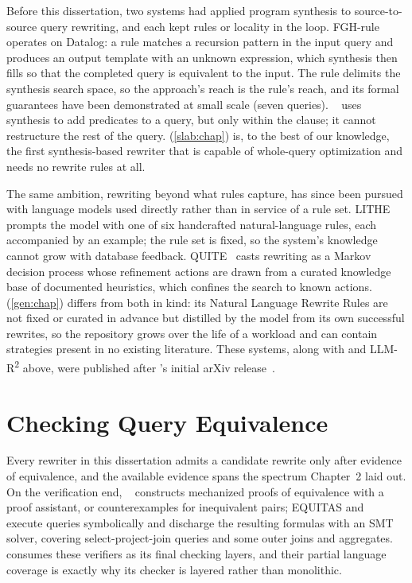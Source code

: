 Before this dissertation, two systems had applied program synthesis to
source-to-source query rewriting, and each kept rules or locality in
the loop. FGH-rule~\cite{wang2022optimizing} operates on Datalog: a
rule matches a recursion pattern in the input query and produces an
output template with an unknown expression, which synthesis then fills
so that the completed query is equivalent to the input. The rule
delimits the synthesis search space, so the approach's reach is the
rule's reach, and its formal guarantees have been demonstrated at
small scale (seven queries). \sia~\cite{zhou2021sia} uses synthesis to
add predicates to a query, but only within the \sqlwherecolor clause;
it cannot restructure the rest of the query. \slabcity
(\cref{slab:chap}) is, to the best of our knowledge, the first
synthesis-based rewriter that is capable of whole-query optimization
and needs no rewrite rules at all.

The same ambition, rewriting beyond what rules capture, has since been
pursued with language models used directly rather than in service of a
rule set. LITHE~\cite{llm-rw2} prompts the model with one of six
handcrafted natural-language rules, each accompanied by an example;
the rule set is fixed, so the system's knowledge cannot grow with
database feedback. QUITE~\cite{song2025quite} casts rewriting as a
Markov decision process whose refinement actions are drawn from a
curated knowledge base of documented heuristics, which confines the
search to known actions. \genrewrite (\cref{gen:chap}) differs from
both in kind: its Natural Language Rewrite Rules are not fixed or
curated in advance but distilled by the model from its own successful
rewrites, so the repository grows over the life of a workload and can
contain strategies present in no existing literature. These systems,
along with \rbot and \textsc{LLM-R\textsuperscript{2}} above, were
published after \genrewrite's initial arXiv
release~\cite{genrewrite-report}.

\section{Checking Query Equivalence}
\label{sec:related:equiv}

Every rewriter in this dissertation admits a candidate rewrite only
after evidence of equivalence, and the available evidence spans the
spectrum Chapter~2 laid out. On the verification end,
\cosette~\cite{chu2017cosette} constructs mechanized proofs of
equivalence with a proof assistant, or counterexamples for
inequivalent pairs; EQUITAS and
\spes~\cite{zhou2019automated,zhou2022spes} execute queries
symbolically and discharge the resulting formulas with an SMT solver,
covering select-project-join queries and some outer joins and
aggregates.  consumes these verifiers as its final
checking layers, and their partial language coverage is exactly why
its checker is layered rather than monolithic.

